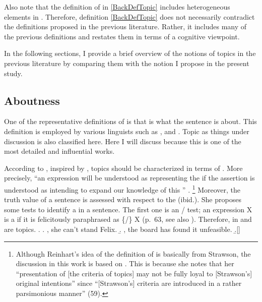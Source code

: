 Also note that the definition of  in \ref{BackDefTopic} includes heterogeneous elements in \Last.
Therefore, definition \ref{BackDefTopic} does not necessarily contradict the definitions proposed in the previous literature.
Rather, it includes many of the previous definitions and restates them in terms of a cognitive viewpoint.

In the following sections, I provide a brief overview of the notions of topics in the previous literature by comparing them with the notion I propose in the present study.

\subsection{Aboutness}

One of the representative definitions of  is that
 is what the sentence is about.
This definition is employed by various linguists such as , and .
Topic as things under discussion \cite[e.g.,][]{heycock08} is also classified here.
Here I will discuss  because this is one of the most detailed and influential works.

According to ,
inspired by ,
topics should be characterized in terms of .
More precisely,
``an expression will be understood as representing the 
if the assertion is understood as intending to expand our knowledge of this '' \cite[59]{reinhart81}.%
  \footnote{
  Although Reinhart's idea of the definition of  is basically from Strawson,
  the discussion in this work is based on .
  This is because she notes that her ``presentation of [the criteria of topics] may not be fully loyal to [Strawson's] original intentions'' since ``[Strawson's] criteria are introduced in a rather parsimonious manner'' (59).
  }
Moreover, the truth value of a sentence is assessed with respect to the  ({ibid.}).
She proposes some tests to identify a  in a sentence.
The first one is an / test;
an expression X is a  if it is felicitously paraphrased as \{/\} X (p.~63, see also ).
Therefore,  in \Next[a] and  \Next[b] are topics.
%
\ex. \a. , she can't stand Felix.
     \b. , the board has found it unfeasible.
     \b.[] \hfill{\cite[59]{reinhart81}}

